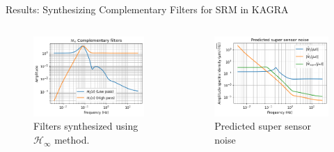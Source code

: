 \documentclass{beamer}
\begin{document}
\begin{frame}[t]
\begin{columns}[t]
\begin{column}{0.32\linewidth}
\begin{block}{Results: Synthesizing Complementary Filters for SRM in KAGRA}
				\begin{columns}[onlytextwidth]
					\begin{column}{0.5\textwidth}
						\begin{figure}
							\centering
							\includegraphics[width=1\linewidth]{complementary_filters_hinfinity}
							\caption{Filters synthesized using $\mathcal{H}_\infty$ method.}
							\label{fig:complementary_filters_hinfinity}
						\end{figure}
					\end{column}
					\begin{column}{0.5\textwidth}
						\begin{figure}
							\centering
							\includegraphics[width=1\linewidth]{super_sensor_noise_tf}
							\caption{Predicted super sensor noise}
							\label{fig:super_sensor_noise_tf}
						\end{figure}
					\end{column}
				\end{columns}
				

\end{block}
\end{column}
\end{columns}
\end{frame}
\end{document}

